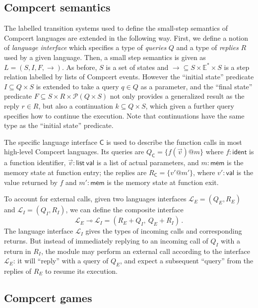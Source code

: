 \documentclass{article}
\newcommand{\kw}[1]{{\mathsf{#1}}}
\begin{document}
\subsection{Compcert semantics}

The labelled transition systems
used to define the small-step semantics of Compcert languages
are extended in the following way.
First,
we define a notion of \emph{language interface}
which specifies a type of \emph{queries} $Q$ and a type of \emph{replies} $R$
used by a given language.
Then, a small step semantics is given as $L = (S, I, F, {\rightarrow})$.
As before, $S$ is a set of states and
${\rightarrow} \subseteq S \times \mathbb{E}^* \times S$
is a step relation labelled by lists of Compcert events.
However the ``initial state'' predicate $I \subseteq Q \times S$
is extended to take a query $q \in Q$ as a parameter,
and the ``final state'' predicate
$F \subseteq S \times R \times \mathcal{P}(Q \times S)$
not only provides a generalized result as the reply $r \in R$,
but also a continuation $k \subseteq Q \times S$,
which given a further query specifies how to continue the execution.
Note that continuations
have the same type as the ``initial state'' predicate.

The specific language interface $\kw{C}$
is used to describe the function calls in most high-level Compcert languages.
Its queries are $Q_\kw{C} = \{ f(\vec{v})@m \}$
where $f : \kw{ident}$ is a function identifier,
$\vec{v} : \kw{list}\ \kw{val}$ is a list of actual parameters, and
$m : \kw{mem}$ is the memory state at function entry;
the replies are $R_\kw{C} = \{ v'@m' \}$,
where $v' : \kw{val}$ is the value returned by $f$ and
$m' : \kw{mem}$ is the memory state at function exit.

To account for external calls,
given two languages interfaces
$\mathcal{L}_E = (Q_E, R_E)$ and
$\mathcal{L}_I = (Q_I, R_I)$,
we can define the composite interface
\[ \mathcal{L}_E \multimap \mathcal{L}_I = (R_E + Q_I, \: Q_E + R_I)\,. \]
The language interface $\mathcal{L}_I$
gives the types of incoming calls and corresponding returns.
But instead of immediately replying to an incoming call of $Q_I$
with a return in $R_I$,
the module may perform an external call
according to the interface $\mathcal{L}_E$:
it will ``reply'' with a query of $Q_E$,
and expect a subsequent ``query'' from the replies of $R_E$
to resume its execution.

\subsection{Compcert games}
\end{document}
